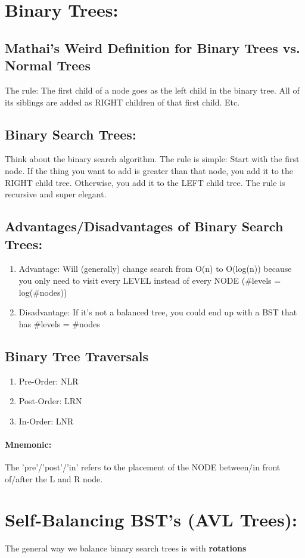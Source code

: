 \documentclass[a4paper,12pt]{report}
\begin{document}
\section{Binary Trees: }
\subsection{Mathai's Weird Definition for Binary Trees vs. Normal Trees}
The rule: The first child of a node goes as the left child in the binary tree. All of its siblings are added as RIGHT children of that first child. Etc.
\subsection{Binary Search Trees: }
Think about the binary search algorithm. The rule is simple: Start with the first node. If the thing you want to add is greater than that node, you add it to the RIGHT child tree. Otherwise, you add it to the LEFT child tree. The rule is recursive and super elegant.
\subsection{Advantages/Disadvantages of Binary Search Trees: }
\begin{enumerate}
\item Advantage: Will (generally) change search from O(n) to O(log(n)) because you only need to visit every LEVEL instead of every NODE (\#levels = log(\#nodes))
\item Disadvantage: If it's not a balanced tree, you could end up with a BST that has \#levels = \#nodes
\end{enumerate}

\subsection{Binary Tree Traversals}
\begin{enumerate}
\item Pre-Order: NLR
\item Post-Order: LRN
\item In-Order: LNR
\end{enumerate}
\paragraph{Mnemonic: } The 'pre'/'post'/'in' refers to the placement of the NODE between/in front of/after the L and R node.

\section{Self-Balancing BST's (AVL Trees): }
The general way we balance binary search trees is with \textbf{rotations}
\end{document}

